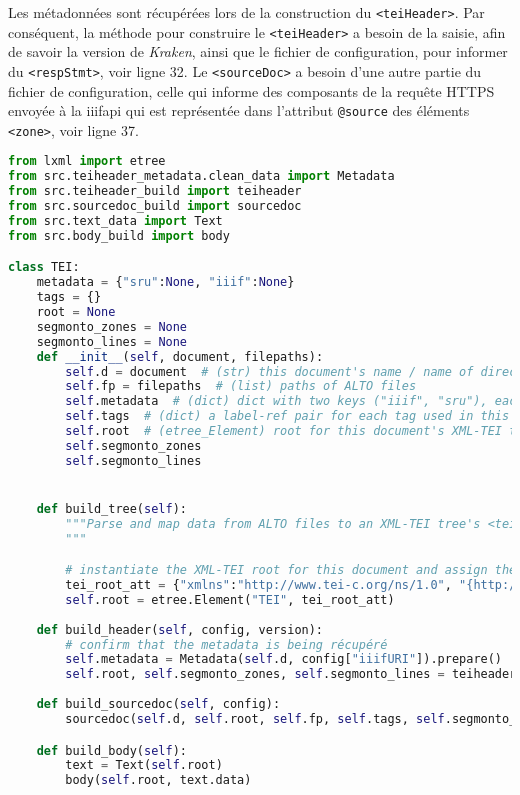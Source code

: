 \documentclass[class=article, crop=false]{standalone}
\begin{document}
\noindent Les métadonnées sont récupérées lors de la construction du \texttt{<teiHeader>}. Par conséquent, la méthode pour construire le \texttt{<teiHeader>} a besoin de la saisie, afin de savoir la version de \textit{Kraken}, ainsi que le fichier de configuration, pour informer du \texttt{<respStmt>}, voir ligne 32. Le \texttt{<sourceDoc>} a besoin d'une autre partie du fichier de configuration, celle qui informe des composants de la requête HTTPS envoyée à la \Gls{iiifapi} qui est représentée dans l'attribut \texttt{@source} des éléments \texttt{<zone>}, voir ligne 37.


\begin{lstlisting}[language=python, style=python]
from lxml import etree
from src.teiheader_metadata.clean_data import Metadata
from src.teiheader_build import teiheader
from src.sourcedoc_build import sourcedoc
from src.text_data import Text
from src.body_build import body

class TEI:
    metadata = {"sru":None, "iiif":None}
    tags = {}
    root = None
    segmonto_zones = None
    segmonto_lines = None
    def __init__(self, document, filepaths):
        self.d = document  # (str) this document's name / name of directory contiaining the ALTO files
        self.fp = filepaths  # (list) paths of ALTO files
        self.metadata  # (dict) dict with two keys ("iiif", "sru"), each of which is equal to its own dictionary of metadata
        self.tags  # (dict) a label-ref pair for each tag used in this document's ALTO files
        self.root  # (etree_Element) root for this document's XML-TEI tree
        self.segmonto_zones
        self.segmonto_lines


    def build_tree(self):
        """Parse and map data from ALTO files to an XML-TEI tree's <teiHeader> and <sourceDoc>.
        """   

        # instantiate the XML-TEI root for this document and assign the root basic attributes
        tei_root_att = {"xmlns":"http://www.tei-c.org/ns/1.0", "{http://www.w3.org/XML/1998/namespace}id":f"ark_12148_{self.d}"}
        self.root = etree.Element("TEI", tei_root_att)
    
    def build_header(self, config, version):
        # confirm that the metadata is being récupéré
        self.metadata = Metadata(self.d, config["iiifURI"]).prepare()
        self.root, self.segmonto_zones, self.segmonto_lines = teiheader(self.metadata, self.d, self.root, len(self.fp), config, version, self.fp, self.segmonto_zones, self.segmonto_lines)
    
    def build_sourcedoc(self, config):
        sourcedoc(self.d, self.root, self.fp, self.tags, self.segmonto_zones, self.segmonto_lines, config["iiifURI"])

    def build_body(self):
        text = Text(self.root)
        body(self.root, text.data)
\end{lstlisting}
\end{document}
